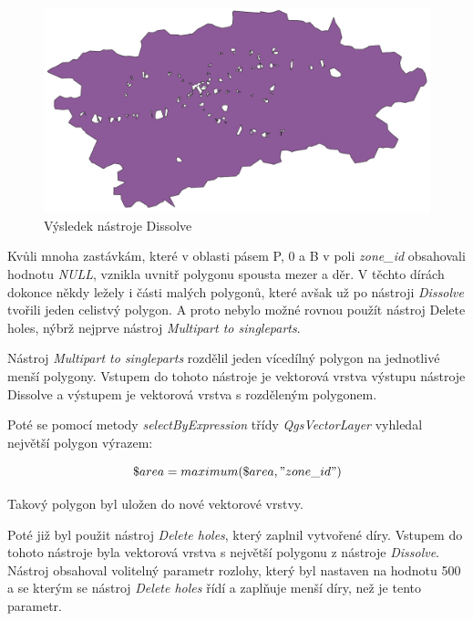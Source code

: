 \begin{figure}[H] \centering
    \includegraphics[width=400pt]{./pictures/dissolve-P0B.png}
    \caption[Výsledek nástroje Dissolve]{Výsledek nástroje Dissolve}
	\label{fig:dissolve}              
\end{figure} 

Kvůli mnoha zastávkám, které v oblasti pásem P, 0 a B v poli \textit{zone\_id} obsahovali hodnotu \textit{NULL},
vznikla uvnitř polygonu spousta mezer a děr. V těchto dírách dokonce někdy ležely i části malých polygonů, které 
avšak už po nástroji \textit{Dissolve} tvořili jeden celistvý polygon. A proto nebylo možné rovnou použít nástroj Delete holes,
nýbrž nejprve nástroj \textit{Multipart to singleparts}.

Nástroj \textit{Multipart to singleparts} rozdělil jeden vícedílný polygon na jednotlivé menší polygony. Vstupem do tohoto
nástroje je vektorová vrstva výstupu nástroje Dissolve a výstupem je vektorová vrstva s rozděleným polygonem.

Poté se pomocí metody \textit{selectByExpression} třídy \textit{QgsVectorLayer} vyhledal nej\-větší polygon
výrazem:

\[\$area = maximum(\$area, "zone\_id")\]

Takový polygon byl uložen do nové vektorové vrstvy. 

Poté již byl použit nástroj \textit{Delete holes}, který zaplnil vytvořené díry. Vstupem do tohoto nástroje byla vektorová
vrstva s největší polygonu z nástroje \textit{Dissolve}. Nástroj obsahoval volitelný parametr rozlohy, který byl
nastaven na hodnotu 500 a se kterým se nástroj \textit{Delete holes} řídí a zaplňuje menší díry, než je tento parametr.  

